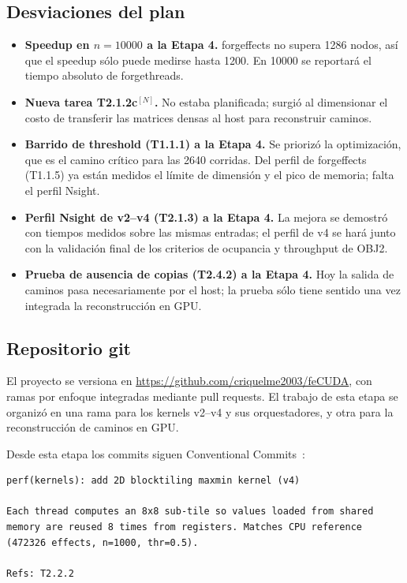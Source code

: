 \documentclass[11pt,a4paper]{article}
\newcommand{\N}{$^{[N]}$}
\begin{document}
\subsection{Desviaciones del plan}
\begin{itemize}
  \item \textbf{Speedup en $n=\num{10000}$ a la Etapa 4.} forgeffects no supera \num{1286}
        nodos, así que el speedup sólo puede medirse hasta \num{1200}. En \num{10000} se
        reportará el tiempo absoluto de forgethreads.
  \item \textbf{Nueva tarea T2.1.2c\N.} No estaba planificada; surgió al dimensionar el costo
        de transferir las matrices densas al host para reconstruir caminos.
  \item \textbf{Barrido de threshold (T1.1.1) a la Etapa 4.} Se priorizó la optimización, que
        es el camino crítico para las \num{2640} corridas. Del perfil de forgeffects (T1.1.5)
        ya están medidos el límite de dimensión y el pico de memoria; falta el perfil Nsight.
  \item \textbf{Perfil Nsight de v2--v4 (T2.1.3) a la Etapa 4.} La mejora se demostró con
        tiempos medidos sobre las mismas entradas; el perfil de v4 se hará junto con la
        validación final de los criterios de ocupancia y throughput de OBJ2.
  \item \textbf{Prueba de ausencia de copias (T2.4.2) a la Etapa 4.} Hoy la salida de caminos
        pasa necesariamente por el host; la prueba sólo tiene sentido una vez integrada la
        reconstrucción en GPU.
\end{itemize}

\subsection{Repositorio git}\label{sec:git}
El proyecto se versiona en \url{https://github.com/criquelme2003/feCUDA}, con ramas por enfoque
integradas mediante pull requests. El trabajo de esta etapa se organizó en una rama para los
kernels v2--v4 y sus orquestadores, y otra para la reconstrucción de caminos en GPU.

Desde esta etapa los commits siguen Conventional Commits~\cite{cc}:
\begin{lstlisting}
perf(kernels): add 2D blocktiling maxmin kernel (v4)

Each thread computes an 8x8 sub-tile so values loaded from shared
memory are reused 8 times from registers. Matches CPU reference
(472326 effects, n=1000, thr=0.5).

Refs: T2.2.2
\end{lstlisting}
\end{document}
